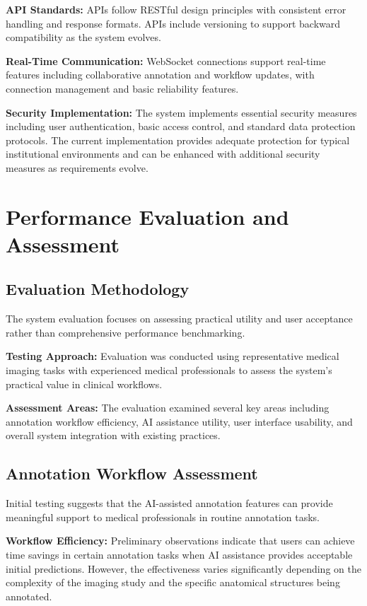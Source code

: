 \textbf{API Standards:} APIs follow RESTful design principles with consistent error handling and response formats. APIs include versioning to support backward compatibility as the system evolves.

\textbf{Real-Time Communication:} WebSocket connections support real-time features including collaborative annotation and workflow updates, with connection management and basic reliability features.

\textbf{Security Implementation:} The system implements essential security measures including user authentication, basic access control, and standard data protection protocols. The current implementation provides adequate protection for typical institutional environments and can be enhanced with additional security measures as requirements evolve.

\section{Performance Evaluation and Assessment}

\subsection{Evaluation Methodology}

The system evaluation focuses on assessing practical utility and user acceptance rather than comprehensive performance benchmarking.

\textbf{Testing Approach:} Evaluation was conducted using representative medical imaging tasks with experienced medical professionals to assess the system's practical value in clinical workflows.

\textbf{Assessment Areas:} The evaluation examined several key areas including annotation workflow efficiency, AI assistance utility, user interface usability, and overall system integration with existing practices.

\subsection{Annotation Workflow Assessment}

Initial testing suggests that the AI-assisted annotation features can provide meaningful support to medical professionals in routine annotation tasks.

\textbf{Workflow Efficiency:} Preliminary observations indicate that users can achieve time savings in certain annotation tasks when AI assistance provides acceptable initial predictions. However, the effectiveness varies significantly depending on the complexity of the imaging study and the specific anatomical structures being annotated.

